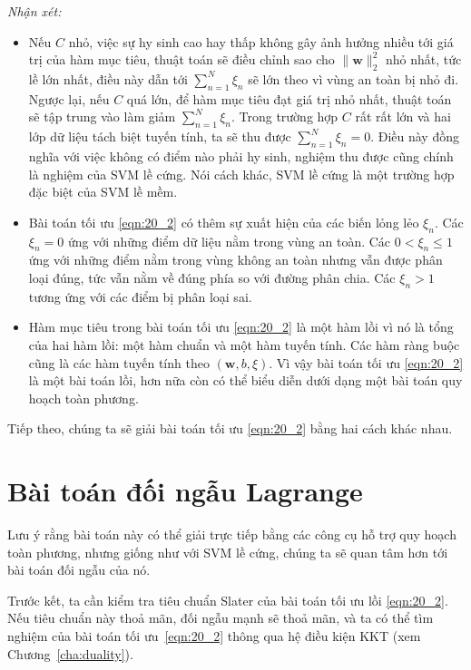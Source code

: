\textit{Nhận xét:}
\begin{itemize}
\item Nếu $C$ nhỏ, việc {sự hy sinh} cao hay thấp không gây ảnh hưởng
nhiều tới giá trị của hàm mục tiêu, thuật toán sẽ điều chỉnh sao cho
$\|\mathbf{w}\|_2^2$ nhỏ nhất, tức lề lớn nhất, điều này
dẫn tới $\sum_{n=1}^N\xi_n$ sẽ lớn theo vì vùng an toàn bị nhỏ đi. Ngược
lại, nếu $C$ quá lớn, để hàm mục tiêu đạt giá trị nhỏ nhất, thuật toán sẽ
tập trung vào làm giảm $\sum_{n=1}^N\xi_n$. Trong trường hợp $C$ rất rất lớn
và hai lớp dữ liệu tách biệt tuyến tính, ta sẽ thu được $\sum_{n=1}^N\xi_n
= 0$. Điều này đồng nghĩa với
việc không có điểm nào phải {hy sinh}, nghiệm thu được cũng chính là nghiệm của SVM lề cứng. Nói cách khác, SVM lề cứng là
một trường hợp đặc biệt của SVM lề mềm.

\item Bài toán tối ưu \eqref{eqn:20_2} có thêm sự xuất hiện của các
biến lỏng lẻo $\xi_n$. Các $\xi_n = 0$ ứng với những
điểm dữ liệu nằm trong {vùng an toàn}. Các $0 < \xi_n \leq 1$ ứng với những điểm nằm trong {vùng không an toàn} nhưng vẫn được phân
loại
đúng, tức vẫn nằm về đúng phía so với đường phân chia. Các $\xi_n > 1$
tương ứng với các điểm bị phân loại sai.

\item Hàm mục tiêu trong bài toán tối ưu \eqref{eqn:20_2} là một hàm lồi vì nó là tổng của hai hàm lồi: một hàm chuẩn và một hàm tuyến tính. Các hàm ràng buộc cũng là các hàm tuyến tính theo $(\mathbf{w}, b, \xi)$. Vì vậy bài toán tối ưu \eqref{eqn:20_2} là một bài toán lồi, hơn nữa còn có thể biểu diễn dưới dạng một bài toán quy hoạch toàn phương.
\end{itemize}

Tiếp theo, chúng ta sẽ giải bài toán tối ưu \eqref{eqn:20_2} bằng hai
cách khác nhau.

\section{Bài toán đối ngẫu Lagrange }
Lưu ý rằng bài toán này có thể giải trực tiếp bằng các công cụ hỗ trợ quy hoạch toàn phương, nhưng
giống như với SVM lề cứng, chúng ta sẽ quan tâm hơn tới bài toán đối ngẫu của nó.

Trước kết, ta cần kiểm tra tiêu chuẩn Slater của bài toán tối ưu lồi
\eqref{eqn:20_2}. Nếu tiêu chuẩn này thoả mãn, đối ngẫu mạnh sẽ
thoả mãn, và ta có thể tìm nghiệm của bài toán tối ưu~\eqref{eqn:20_2} thông qua
hệ điều kiện KKT (xem Chương~\ref{cha:duality}).


